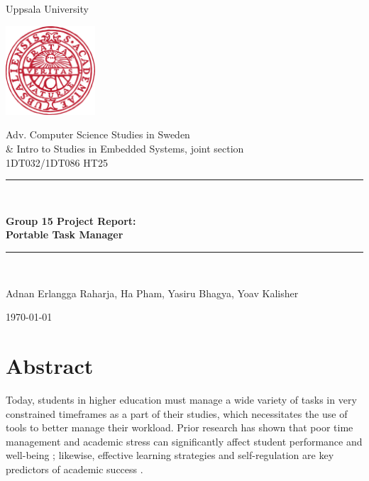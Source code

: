 \documentclass[11pt,oneside]{article}
\begin{document}
\begin{titlepage}
    \centering

    \vspace*{\fill}

    {\Large Uppsala University\par}
    \vspace{1cm}

    \includegraphics[width=0.25\textwidth]{Uppsala_University_seal.png}\par
    \vspace{1cm}
    
    {\Large Adv. Computer Science Studies in Sweden \\ \& Intro to Studies in Embedded Systems, joint section \\ 1DT032/1DT086 HT25}


    \rule{\textwidth}{0.4pt}\\[0.5cm]
    {\Huge\bfseries Group 15 Project Report:\\Portable Task Manager\par}
    \vspace{0.5cm}
    \rule{\textwidth}{0.4pt}\\[2cm] 

    {\Large Adnan Erlangga Raharja, Ha Pham, Yasiru Bhagya, Yoav Kalisher\par}
    \vspace{1cm}
    
    {\Large \today\par}

    \vspace*{\fill}
\end{titlepage}

\vspace*{3cm}

\section*{Abstract}

Today, students in higher education must manage a wide variety of tasks in very constrained timeframes as a part of their studies, which necessitates the use of tools to better manage their workload. Prior research has shown that poor time management and academic stress can significantly affect student performance and well-being \citep{misra2000college}; likewise, effective learning strategies and self-regulation are key predictors of academic success \citep{zimmerman2002becoming}.
\end{document}
